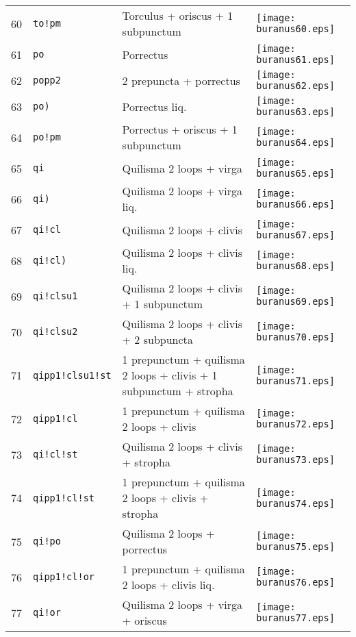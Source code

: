 \documentclass{scrarticle}
\begin{document}
\begin{longtable}{l|l|l|l}
60 & \texttt{to!pm} & Torculus + oriscus + 1 subpunctum & \texttt{[image: buranus60.eps]} \\
61 & \texttt{po} & Porrectus & \texttt{[image: buranus61.eps]} \\
62 & \texttt{popp2} & 2 prepuncta + porrectus & \texttt{[image: buranus62.eps]} \\
63 & \texttt{po)} & Porrectus liq. & \texttt{[image: buranus63.eps]} \\
64 & \texttt{po!pm} & Porrectus + oriscus + 1 subpunctum & \texttt{[image: buranus64.eps]} \\
65 & \texttt{qi} & Quilisma 2 loops + virga & \texttt{[image: buranus65.eps]} \\
66 & \texttt{qi)} & Quilisma 2 loops + virga liq. & \texttt{[image: buranus66.eps]} \\
67 & \texttt{qi!cl} & Quilisma 2 loops + clivis & \texttt{[image: buranus67.eps]} \\
68 & \texttt{qi!cl)} & Quilisma 2 loops + clivis liq. & \texttt{[image: buranus68.eps]} \\
69 & \texttt{qi!clsu1} & Quilisma 2 loops + clivis + 1 subpunctum & \texttt{[image: buranus69.eps]} \\
70 & \texttt{qi!clsu2} & Quilisma 2 loops + clivis + 2 subpuncta & \texttt{[image: buranus70.eps]} \\
71 & \texttt{qipp1!clsu1!st} & 1 prepunctum + quilisma 2 loops + clivis + 1 subpunctum + stropha & \texttt{[image: buranus71.eps]} \\
72 & \texttt{qipp1!cl} & 1 prepunctum + quilisma 2 loops + clivis & \texttt{[image: buranus72.eps]} \\
73 & \texttt{qi!cl!st} & Quilisma 2 loops + clivis + stropha & \texttt{[image: buranus73.eps]} \\
74 & \texttt{qipp1!cl!st} & 1 prepunctum + quilisma 2 loops + clivis + stropha & \texttt{[image: buranus74.eps]} \\
75 & \texttt{qi!po} & Quilisma 2 loops + porrectus & \texttt{[image: buranus75.eps]} \\
76 & \texttt{qipp1!cl!or} & 1 prepunctum + quilisma 2 loops + clivis liq. & \texttt{[image: buranus76.eps]} \\
77 & \texttt{qi!or} & Quilisma 2 loops + virga + oriscus & \texttt{[image: buranus77.eps]} \\

\end{longtable}
\end{document}
